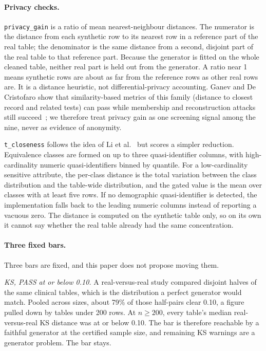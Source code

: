 \documentclass[11pt,a4paper]{article}
\begin{document}
\paragraph{Privacy checks.}
\texttt{privacy\_gain} is a ratio of mean nearest-neighbour distances. The numerator is the distance from each synthetic row to its nearest row in a reference part of the real table; the denominator is the same distance from a second, disjoint part of the real table to that reference part. Because the generator is fitted on the whole cleaned table, neither real part is held out from the generator. A ratio near 1 means synthetic rows are about as far from the reference rows as other real rows are. It is a distance heuristic, not differential-privacy accounting. Ganev and De Cristofaro show that similarity-based metrics of this family (distance to closest record and related tests) can pass while membership and reconstruction attacks still succeed~\cite{ganev2025}; we therefore treat privacy gain as one screening signal among the nine, never as evidence of anonymity.

\texttt{t\_closeness} follows the idea of Li et al.~\cite{li2007} but scores a simpler reduction. Equivalence classes are formed on up to three quasi-identifier columns, with high-cardinality numeric quasi-identifiers binned by quantile. For a low-cardinality sensitive attribute, the per-class distance is the total variation between the class distribution and the table-wide distribution, and the gated value is the mean over classes with at least five rows. If no demographic quasi-identifier is detected, the implementation falls back to the leading numeric columns instead of reporting a vacuous zero. The distance is computed on the synthetic table only, so on its own it cannot say whether the real table already had the same concentration.

\paragraph{Three fixed bars.}
Three bars are fixed, and this paper does not propose moving them.

\emph{KS, PASS at or below 0.10.} A real-versus-real study compared disjoint halves of the same clinical tables, which is the distribution a perfect generator would match. Pooled across sizes, about 79\% of those half-pairs clear 0.10, a figure pulled down by tables under 200 rows. At $n \ge 200$, every table's median real-versus-real KS distance was at or below 0.10. The bar is therefore reachable by a faithful generator at the certified sample size, and remaining KS warnings are a generator problem. The bar stays.
\end{document}

